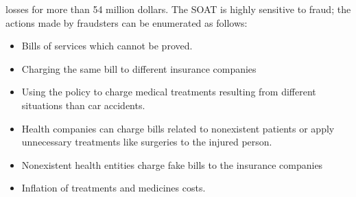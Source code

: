 \documentclass[parskip=full]{scrartcl}
\begin{document}
losses for more than 54 million dollars. 
The SOAT is highly sensitive to fraud; the actions made by fraudsters can be 
enumerated as follows: 
\begin{itemize}
	\item Bills of services which cannot be proved.
	\item Charging the same bill to different insurance companies
	\item Using the policy to charge medical treatments resulting from 
	different situations than car accidents.
	\item Health companies can charge bills related to nonexistent patients or 
	apply unnecessary treatments like surgeries to the injured person.
	\item Nonexistent health entities charge fake bills to the insurance 
	companies
	\item Inflation of treatments and medicines costs.
\end{itemize}





\end{document}
